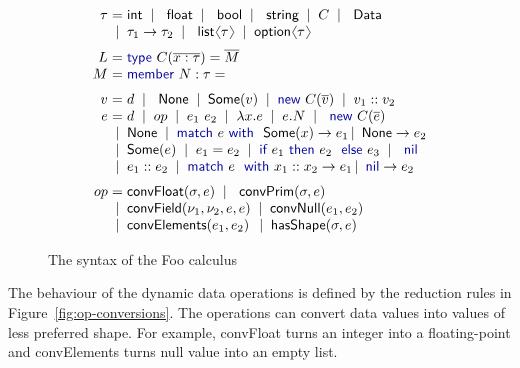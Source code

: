\documentclass[10pt,preprint,blind,clearpagebib]{sigplanconf}
\newcommand{\langl}{\begin{picture}(4.5,7)
\put(1.1,2.5){\rotatebox{60}{\line(1,0){5.5}}}
\put(1.1,2.5){\rotatebox{300}{\line(1,0){5.5}}}
\end{picture}}
\newcommand{\rangl}{\begin{picture}(4.5,7)
\put(.9,2.5){\rotatebox{120}{\line(1,0){5.5}}}
\put(.9,2.5){\rotatebox{240}{\line(1,0){5.5}}}
\end{picture}}
\newcommand{\kvd}[1]{\textnormal{\textcolor{kvdclr}{\sffamily #1}}}
\newcommand{\num}[1]{\textnormal{\textcolor{numclr}{\sffamily #1}}}
\newcommand{\ident}[1]{\textnormal{\sffamily #1}}
\newcommand{\lsep}[0]{\;\; | \;\;}
\newcommand{\narrow}[1]{\hspace{-0.7em} #1 \hspace{-0.7em}}
\begin{document}
\begin{figure}[!h]
\noindent
\begin{equation*}
\begin{array}{rcl}
 \tau &\narrow{=}& \ident{int} \lsep \ident{float} \lsep \ident{bool} \lsep \ident{string} \lsep C \lsep \ident{Data} \\[0.0em]
      &\narrow{|}& \tau_1 \rightarrow \tau_2 \lsep \ident{list}\langl\tau\rangl \lsep \ident{option}\langl\tau\rangl 
\\[0.6em]
 L &\narrow{=}& \kvd{type}~C(\overline{x:\tau}) = \overline{M} \\[0.0em]
 M &\narrow{=}& \kvd{member}~N:\tau=
\\[0.6em]
 v &\narrow{=}& d \lsep \ident{None} \lsep \ident{Some}(v) \lsep \kvd{new}~C(\overline{v}) \lsep v_1::v_2 \\[0.0em]
 e &\narrow{=}& d \lsep op \lsep e_1~e_2 \lsep \lambda x.e \lsep e.N \lsep \kvd{new}~C(\overline{e}) \\
   &\narrow{|}& \ident{None} \lsep\kvd{match}~e~\kvd{with}~\ident{Some}(x) \rightarrow e_1 \,|\, \ident{None} \rightarrow e_2 \\
   &\narrow{|}& \ident{Some}(e) \lsep e_1 = e_2 \lsep {\kvd{if}~e_1~\kvd{then}~e_2~\kvd{else}~e_3} \lsep \kvd{nil} \\
   &\narrow{|}& e_1 :: e_2 \lsep \kvd{match}~e~\kvd{with}~x_1::x_2 \rightarrow e_1 \,|\, \kvd{nil} \rightarrow e_2 
\\[0.6em]
op &\narrow{=}& \ident{convFloat}(\sigma, e) \lsep \ident{convPrim}(\sigma, e) \\
   &\narrow{|}& \ident{convField}(\nu_1, \nu_2, e, e) \lsep \ident{convNull}(e_1, e_2) \\
   &\narrow{|}& \ident{convElements}(e_1, e_2) \,\lsep \ident{hasShape}(\sigma, e) 
\end{array}
\end{equation*}

\caption{The syntax of the Foo calculus}
\label{fig:foo-syntax}
\vspace{-0.5em}
\end{figure}


The behaviour of the dynamic data operations is defined by the reduction rules in 
Figure~\ref{fig:op-conversions}. The operations can convert data values into values of 
less preferred shape. For example, \ident{convFloat} turns an integer \num{1} into 
a floating-point \num{1.0} and \ident{convElements} turns \kvd{null} value into an empty list.
\end{document}
